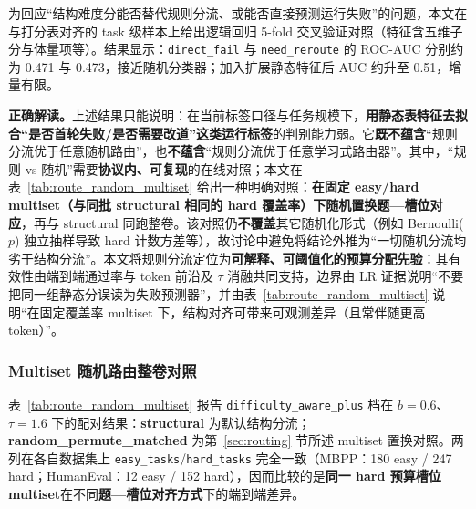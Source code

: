 为回应“结构难度分能否替代规则分流、或能否直接预测运行失败”的问题，本文在与打分表对齐的 task 级样本上给出逻辑回归 5-fold 交叉验证对照（特征含五维子分与体量项等）。结果显示：\texttt{direct\_fail} 与 \texttt{need\_reroute} 的 ROC-AUC 分别约为 0.471 与 0.473，接近随机分类器；加入扩展静态特征后 AUC 约升至 0.51，增量有限。

\textbf{正确解读。}上述结果只能说明：在当前标签口径与任务规模下，\textbf{用静态表特征去拟合“是否首轮失败/是否需要改道”这类运行标签}的判别能力弱。它\textbf{既不蕴含}“规则分流优于任意随机路由”，也\textbf{不蕴含}“规则分流优于任意学习式路由器”。其中，``规则 vs 随机''需要\textbf{协议内、可复现}的在线对照；本文在表~\ref{tab:route_random_multiset} 给出一种明确对照：\textbf{在固定 easy/hard multiset（与同批 structural 相同的 hard 覆盖率）下随机置换题—槽位对应}，再与 structural 同跑整卷。该对照仍\textbf{不覆盖}其它随机化形式（例如 Bernoulli($p$) 独立抽样导致 hard 计数方差等），故讨论中避免将结论外推为“一切随机分流均劣于结构分流”。本文将规则分流定位为\textbf{可解释、可阈值化的预算分配先验}：其有效性由端到端通过率与 token 前沿及 $\tau$ 消融共同支持，边界由 LR 证据说明“不要把同一组静态分误读为失败预测器”，并由表~\ref{tab:route_random_multiset} 说明“在固定覆盖率 multiset 下，结构对齐可带来可观测差异（且常伴随更高 token）”。

\subsubsection{Multiset 随机路由整卷对照}

表~\ref{tab:route_random_multiset} 报告 \texttt{difficulty\_aware\_plus} 档在 $b{=}0.6$、$\tau{=}1.6$ 下的配对结果：\textbf{structural} 为默认结构分流；\textbf{random\_permute\_matched} 为第~\ref{sec:routing} 节所述 multiset 置换对照。两列在各自数据集上 \texttt{easy\_tasks}/\texttt{hard\_tasks} 完全一致（MBPP：180 easy / 247 hard；HumanEval：12 easy / 152 hard），因而比较的是\textbf{同一 hard 预算槽位 multiset}在不同\textbf{题—槽位对齐方式}下的端到端差异。

